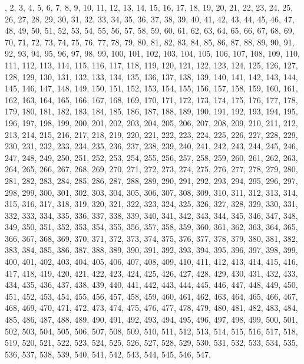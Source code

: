 \documentclass[a4paper,11pt]{article}
\numberwithin{equation}{section}
\begin{document}
, 2, 3, 4, 5, 6, 7, 8, 9, 10, 11, 12, 13, 14, 15, 16, 17, 18, 19, 20, 21,
22, 23, 24, 25, 26, 27, 28, 29, 30, 31, 32, 33, 34, 35, 36, 37, 38, 39, 40,
41, 42, 43, 44, 45, 46, 47, 48, 49, 50, 51, 52, 53, 54, 55, 56, 57, 58, 59,
60, 61, 62, 63, 64, 65, 66, 67, 68, 69, 70, 71, 72, 73, 74, 75, 76, 77, 78,
79, 80, 81, 82, 83, 84, 85, 86, 87, 88, 89, 90, 91, 92, 93, 94, 95, 96,
97, 98, 99, 100, 101, 102, 103, 104, 105, 106, 107, 108, 109, 110, 111, 112,
113, 114, 115, 116, 117, 118, 119, 120, 121, 122, 123, 124, 125, 126, 127,
128, 129, 130, 131, 132, 133, 134, 135, 136, 137, 138, 139, 140, 141, 142,
143, 144, 145, 146, 147, 148, 149, 150, 151, 152, 153, 154, 155, 156, 157,
158, 159, 160, 161, 162, 163, 164, 165, 166, 167, 168, 169, 170, 171, 172,
173, 174, 175, 176, 177, 178, 179, 180, 181, 182, 183, 184, 185, 186, 187,
188, 189, 190, 191, 192, 193, 194, 195, 196, 197, 198, 199, 200, 201, 202,
203, 204, 205, 206, 207, 208, 209, 210, 211, 212, 213, 214, 215, 216, 217,
218, 219, 220, 221, 222, 223, 224, 225, 226, 227, 228, 229, 230, 231, 232,
233, 234, 235, 236, 237, 238, 239, 240, 241, 242, 243, 244, 245, 246, 247,
248, 249, 250, 251, 252, 253, 254, 255, 256, 257, 258, 259, 260, 261, 262,
263, 264, 265, 266, 267, 268, 269, 270, 271, 272, 273, 274, 275, 276, 277,
278, 279, 280, 281, 282, 283, 284, 285, 286, 287, 288, 289, 290, 291, 292,
293, 294, 295, 296, 297, 298, 299, 300, 301, 302, 303, 304, 305, 306, 307,
308, 309, 310, 311, 312, 313, 314, 315, 316, 317, 318, 319, 320, 321, 322,
323, 324, 325, 326, 327, 328, 329, 330, 331, 332, 333, 334, 335, 336, 337,
338, 339, 340, 341, 342, 343, 344, 345, 346, 347, 348, 349, 350, 351, 352,
353, 354, 355, 356, 357, 358, 359, 360, 361, 362, 363, 364, 365, 366, 367,
368, 369, 370, 371, 372, 373, 374, 375, 376, 377, 378, 379, 380, 381, 382,
383, 384, 385, 386, 387, 388, 389, 390, 391, 392, 393, 394, 395, 396, 397,
398, 399, 400, 401, 402, 403, 404, 405, 406, 407, 408, 409, 410, 411, 412,
413, 414, 415, 416, 417, 418, 419, 420, 421, 422, 423, 424, 425, 426, 427,
428, 429, 430, 431, 432, 433, 434, 435, 436, 437, 438, 439, 440, 441, 442,
443, 444, 445, 446, 447, 448, 449, 450, 451, 452, 453, 454, 455, 456, 457,
458, 459, 460, 461, 462, 463, 464, 465, 466, 467, 468, 469, 470, 471, 472,
473, 474, 475, 476, 477, 478, 479, 480, 481, 482, 483, 484, 485, 486, 487,
488, 489, 490, 491, 492, 493, 494, 495, 496, 497, 498, 499, 500, 501, 502,
503, 504, 505, 506, 507, 508, 509, 510, 511, 512, 513, 514, 515, 516, 517,
518, 519, 520, 521, 522, 523, 524, 525, 526, 527, 528, 529, 530, 531, 532,
533, 534, 535, 536, 537, 538, 539, 540, 541, 542, 543, 544, 545, 546, 547,
\end{document}
